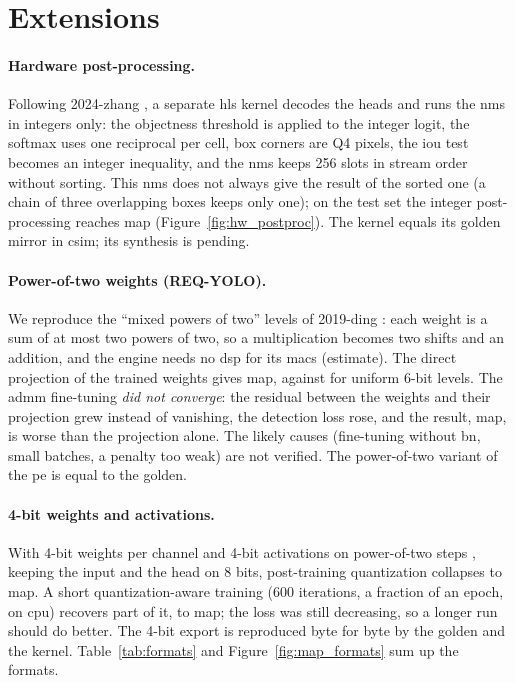 \documentclass[11pt,a4paper]{article}
\begin{document}
\section{Extensions}\label{sec:extensions}

\paragraph{Hardware post-processing.} Following 2024-zhang
\cite[\#013.1, \#014.0]{2024-zhang}, a separate \gls{hls} kernel decodes the heads and runs the
\gls{nms} in integers only: the \gls{objectness} threshold is applied to the integer logit, the
softmax uses one reciprocal per cell, box corners are Q4 pixels, the \gls{iou} test becomes an
integer inequality, and the \gls{nms} keeps 256 slots in stream order without sorting. This \gls{nms}
does not always give the result of the sorted one (a chain of three overlapping boxes
keeps only one); on the test set the integer post-processing reaches
 \gls{map} (Figure~\ref{fig:hw_postproc}). The kernel equals its
golden mirror in \gls{csim}; its synthesis is pending.


\paragraph{Power-of-two weights (REQ-YOLO).} We reproduce the ``mixed powers of two''
levels of 2019-ding \cite[\#008.1]{2019-ding}: each weight is a sum of at most two powers
of two, so a multiplication becomes two shifts and an addition, and the engine needs no
\gls{dsp} for its \glspl{mac} (estimate). The direct projection of the trained weights gives
 \gls{map}, against  for uniform 6-bit
levels. The \gls{admm} fine-tuning \cite[\#009.1]{2019-ding} \emph{did not converge}: the
residual between the weights and their projection grew instead of vanishing, the
detection loss rose, and the result,  \gls{map}, is worse than the
projection alone. The likely causes (fine-tuning without \gls{bn}, small batches, a penalty too
weak) are not verified. The power-of-two variant of the \gls{pe} is  equal to the \gls{golden}.

\paragraph{4-bit weights and activations.} With 4-bit weights per channel and 4-bit
activations on power-of-two steps \cite[\#006.0]{2024-yan}, keeping the input and the head
on 8 bits, post-training quantization collapses to  \gls{map}. A
short quantization-aware training (600 iterations, a fraction of an epoch, on \gls{cpu})
recovers part of it, to  \gls{map}; the loss was still decreasing,
so a longer run should do better. The 4-bit export is reproduced byte for byte by the
\gls{golden} and the  kernel. Table~\ref{tab:formats} and
Figure~\ref{fig:map_formats} sum up the formats.
\end{document}
